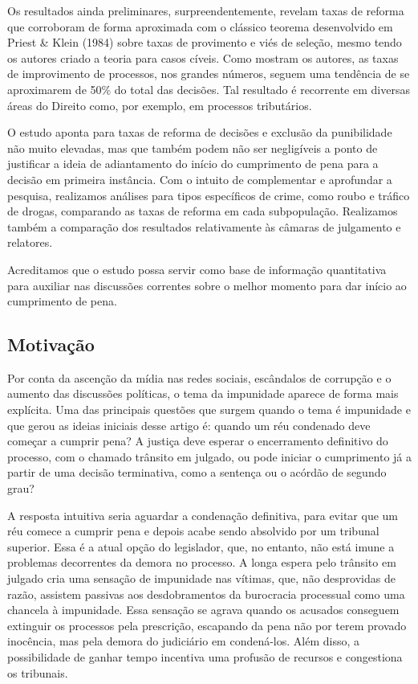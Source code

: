 \documentclass[10pt,]{article}
\begin{document}
Os resultados ainda preliminares, surpreendentemente, revelam taxas de
reforma que corroboram de forma aproximada com o clássico teorema
desenvolvido em Priest \& Klein (1984) sobre taxas de provimento e viés
de seleção, mesmo tendo os autores criado a teoria para casos cíveis.
Como mostram os autores, as taxas de improvimento de processos, nos
grandes números, seguem uma tendência de se aproximarem de 50\% do total
das decisões. Tal resultado é recorrente em diversas áreas do Direito
como, por exemplo, em processos tributários.

O estudo aponta para taxas de reforma de decisões e exclusão da
punibilidade não muito elevadas, mas que também podem não ser
negligíveis a ponto de justificar a ideia de adiantamento do início do
cumprimento de pena para a decisão em primeira instância. Com o intuito
de complementar e aprofundar a pesquisa, realizamos análises para tipos
específicos de crime, como roubo e tráfico de drogas, comparando as
taxas de reforma em cada subpopulação. Realizamos também a comparação
dos resultados relativamente às câmaras de julgamento e relatores.

Acreditamos que o estudo possa servir como base de informação
quantitativa para auxiliar nas discussões correntes sobre o melhor
momento para dar início ao cumprimento de pena.

\subsection{Motivação}\label{motivacao}

Por conta da ascenção da mídia nas redes sociais, escândalos de
corrupção e o aumento das discussões políticas, o tema da impunidade
aparece de forma mais explícita. Uma das principais questões que surgem
quando o tema é impunidade e que gerou as ideias iniciais desse artigo
é: quando um réu condenado deve começar a cumprir pena? A justiça deve
esperar o encerramento definitivo do processo, com o chamado trânsito em
julgado, ou pode iniciar o cumprimento já a partir de uma decisão
terminativa, como a sentença ou o acórdão de segundo grau?

A resposta intuitiva seria aguardar a condenação definitiva, para evitar
que um réu comece a cumprir pena e depois acabe sendo absolvido por um
tribunal superior. Essa é a atual opção do legislador, que, no entanto,
não está imune a problemas decorrentes da demora no processo. A longa
espera pelo trânsito em julgado cria uma sensação de impunidade nas
vítimas, que, não desprovidas de razão, assistem passivas aos
desdobramentos da burocracia processual como uma chancela à impunidade.
Essa sensação se agrava quando os acusados conseguem extinguir os
processos pela prescrição, escapando da pena não por terem provado
inocência, mas pela demora do judiciário em condená-los. Além disso, a
possibilidade de ganhar tempo incentiva uma profusão de recursos e
congestiona os tribunais.
\end{document}
